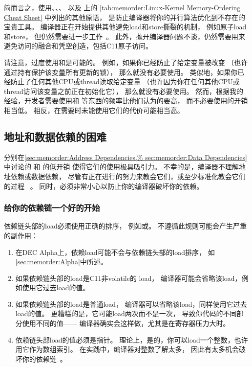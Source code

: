 简而言之，使用、、、
以及
上的
\cref{tab:memorder:Linux-Kernel Memory-Ordering Cheat Sheet}
中列出的其他原语，
是防止编译器将你的并行算法优化到不存在的宝贵工具。
编译器正在开始提供其他避免load和store撕裂的机制，
例如原子load和store，
但仍然需要进一步工作~\cite{JonathanCorbet2016C11atomics}。
此外，抛开编译器问题不谈，仍然需要用来
避免访问的融合和凭空创造，包括C11原子访问。

请注意，过度使用和是可能的。
例如，如果你已经防止了给定变量被改变
（也许通过持有保护该变量所有更新的锁），
那么就没有必要使用。
类似地，如果你已经防止了任何其他CPU或thread读取给定变量
（也许因为你在任何其他CPU或thread访问该变量之前正在初始化它），
那么就没有必要使用。
然而，根据我的经验，开发者需要使用和
等东西的频率比他们认为的要高，
而不必要使用的开销相当低。
相反，在需要时未能使用它们的代价可能相当高。

\subsection{地址和数据依赖的困难}
\label{sec:memorder:Address- and Data-Dependency Difficulties}

分别在\cref{sec:memorder:Address Dependencies,%
sec:memorder:Data Dependencies}中讨论的
和
的低开销
使得它们的使用极具吸引力。
不幸的是，编译器不理解地址依赖或数据依赖，
尽管有正在进行的努力来教会它们，或至少标准化教会它们的过程
~\cite{PaulEMcKennneyConsumeP0190R4,PaulEMcKenney2017markconsumeP0462R1}。
同时，必须非常小心以防止你的编译器破坏你的依赖。

\subsubsection{给你的依赖链一个好的开始}
依赖链头部的load必须使用正确的排序，
例如或。
不遵循此规则可能会产生严重的副作用：

\begin{enumerate}
\item	在DEC Alpha上，依赖load可能不会与依赖链头部的load排序，
	如\cref{sec:memorder:Alpha}中所述。
\item	如果依赖链头部的load是C11非volatile的 load，
	编译器可能会省略该load，例如使用它过去load的值。
\item	如果依赖链头部的load是普通load，
	编译器可以省略该load，同样使用它过去load的值。
	更糟糕的是，它可能load两次而不是一次，
	导致你代码的不同部分使用不同的值——
	编译器确实会这样做，尤其是在寄存器压力大时。
\item	依赖链头部load的值必须是指针。
	理论上，是的，你可以load一个整数，也许用它作为数组索引。
	在实践中，编译器对整数了解太多，
	因此有太多机会破坏你的依赖链~\cite{PaulEMcKennneyConsumeP0190R4}。
\end{enumerate}

